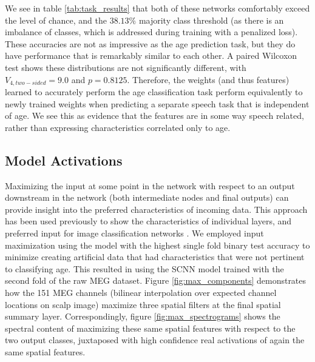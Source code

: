 \documentclass[fleqn,10pt]{wlscirep}
\begin{document}
We see in table \ref{tab:task_results} that both of these networks comfortably exceed the level of chance, and the $38.13\%$ majority class threshold (as there is an imbalance of classes, which is addressed during training with a penalized loss). These accuracies are not as impressive as the age prediction task, but they do have performance that is remarkably similar to each other. A paired Wilcoxon test shows these distributions are not significantly different, with $V_{4, two-sided}=9.0$ and $p=0.8125$. Therefore, the weights (and thus features) learned to accurately perform the age classification task perform equivalently to newly trained weights when predicting a separate speech task that is independent of age. We see this as evidence that the features are in some way speech related, rather than expressing characteristics correlated only to age.

\subsection*{Model Activations}

Maximizing the input at some point in the network with respect to an output downstream in the network (both intermediate nodes and final outputs) can provide insight into the preferred characteristics of incoming data. This approach has been used previously to show the characteristics of individual layers, and preferred input for image classification networks \cite{Yosinski2015}. We employed input maximization using the model with the highest single fold binary test accuracy to minimize creating artificial data that had characteristics that were not pertinent to classifying age. This resulted in using the SCNN model trained with the second fold of the raw MEG dataset. Figure \ref{fig:max_components} demonstrates how the 151 MEG channels (bilinear interpolation over expected channel locations on scalp image) maximize three spatial filters at the final spatial summary layer. Correspondingly, figure \ref{fig:max_spectrograms} shows the spectral content of maximizing these same spatial features with respect to the two output classes, juxtaposed with high confidence real activations of again the same spatial features.
\end{document}

